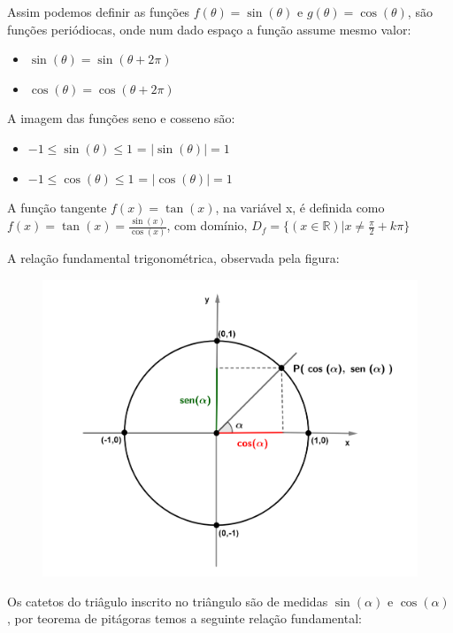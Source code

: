 \begin{multicols*}{2}
    Assim podemos definir as funções $f(\theta) = \sin(\theta)$ e $g(\theta) = \cos(\theta)$, são funções periódiocas, onde num dado espaço a função assume mesmo valor:
    \begin{itemize}
        \item $\sin(\theta) = \sin(\theta  + 2 \pi)$
        \item $\cos(\theta) = \cos(\theta +  2 \pi)$
    \end{itemize}

    A imagem das funções seno e cosseno são:
    \begin{itemize}
        \item $-1 \le \sin(\theta) \le 1$ = $|\sin(\theta)| = 1$
        \item $-1 \le \cos(\theta) \le 1$ = $|\cos(\theta)| = 1$
    \end{itemize}

    A função tangente $f(x)  = \tan(x)$, na variável x, é definida como
    $f(x) = \tan(x) = \frac{\sin(x)}{\cos(x)}$, com domínio,
    $D_f = \{ (x \in \mathbb{R})| x \ne \frac{\pi}{2} + k \pi \}$

    A relação fundamental trigonométrica, observada pela figura:
    \begin{figure}[H]
        \centering
        \includegraphics[scale=0.15]{assets/rafael/img32.png}
    \end{figure}
    Os catetos do triâgulo inscrito no triângulo são de medidas $\sin(\alpha)$ e $\cos(\alpha)$, por teorema de pitágoras temos a seguinte relação fundamental:


\end{multicols*}
